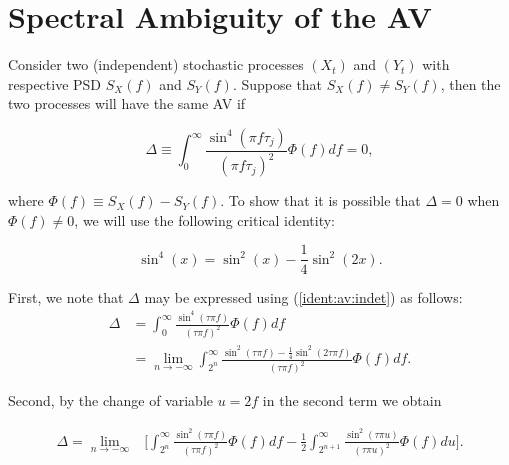 \documentclass[]{book}
\theoremstyle{definition}
\theoremstyle{definition}
\theoremstyle{definition}
\theoremstyle{remark}
\begin{document}
\hypertarget{spectral-ambiguity-of-the-av}{%
\section{Spectral Ambiguity of the
AV}\label{spectral-ambiguity-of-the-av}}

Consider two (independent) stochastic processes \((X_t)\) and \((Y_t)\)
with respective PSD \(S_X(f)\) and \(S_Y(f)\). Suppose that
\(S_X(f) \neq S_Y(f)\), then the two processes will have the same AV if

\begin{equation*}
     \Delta \equiv \int_0^{\infty}  \frac{\sin^4(\pi f \tau_j)}{(\pi f \tau_j)^2} \Phi(f) df = 0,
\end{equation*}

where \(\Phi(f) \equiv S_{X}(f) - S_{Y}(f)\). To show that it is
possible that \(\Delta = 0\) when \(\Phi(f) \neq 0\), we will use the
following critical identity:

\begin{equation}
    \label{ident:av:indet}
    \sin^4(x) = \sin^2(x) - \frac{1}{4} \sin^2(2x).
\end{equation}

First, we note that \(\Delta\) may be expressed using
(\ref{ident:av:indet}) as follows: \begin{equation*}
    \begin{aligned}
        \Delta &=  \int_{0}^{\infty} \frac{\sin^4\left(\tau \pi f \right)}{\left(\tau \pi f \right)^2} \Phi(f) df \\
        &= \lim_{n \rightarrow -\infty} \int_{2^{n}}^{\infty} \frac{\sin^2\left(\tau \pi f \right) - \frac{1}{4} \sin^2\left(2 \tau \pi f \right) }{\left(\tau \pi f \right)^2} \Phi(f) df .
    \end{aligned}
\end{equation*}

Second, by the change of variable \(u = 2f\) in the second term we
obtain

\begin{equation*}
    \begin{aligned}
        \Delta = \lim_{n \rightarrow -\infty} & \Bigg[ \int_{2^{n}}^{\infty} \frac{\sin^2\left(\tau \pi f \right)}{\left(\tau \pi f \right)^2} \Phi(f) df - \frac{1}{2}\int_{2^{n+1}}^{\infty} \frac{\sin^2\left(\tau \pi u \right)}{\left(\tau \pi u \right)^2} \Phi(f) du \Bigg].
    \end{aligned}
\end{equation*}
\end{document}

